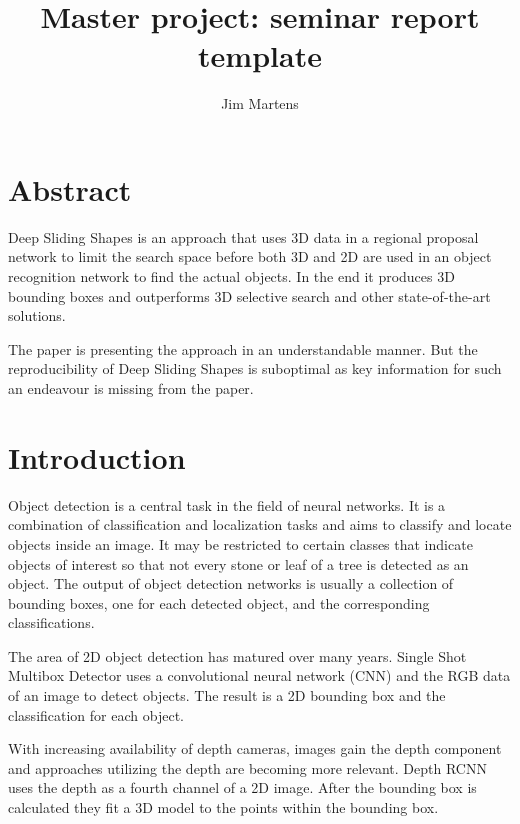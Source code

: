 \documentclass[12pt]{scrartcl}
\begin{document}
\title{Master project: seminar report template}
\author{Jim Martens}

\maketitle
\section*{Abstract}

Deep Sliding Shapes is an approach that uses 3D data in a regional proposal
network to limit the search space before both 3D and 2D are used in an object
recognition network to find the actual objects. In the end it produces 3D
bounding boxes and outperforms 3D selective search and other state-of-the-art
solutions.

The paper is presenting the approach in an understandable manner. But the
reproducibility of Deep Sliding Shapes is suboptimal as key information for
such an endeavour is missing from the paper.


\setcounter{tocdepth}{2} 					%
\tableofcontents
{}
\clearpage

\section{Introduction}

Object detection is a central task in the field of neural networks. It is a
combination of classification and localization tasks and aims to classify
and locate objects inside an image. It may be restricted to certain classes
that indicate objects of interest so that not every stone or leaf of a tree
is detected as an object. The output of object detection networks is usually
a collection of bounding boxes, one for each detected object, and the corresponding
classifications.

The area of 2D object detection has matured over many years. Single Shot Multibox
Detector\cite{Liu2016} uses a convolutional neural network (CNN) and the RGB
data of an image to detect objects. The result is a 2D bounding box and the
classification for each object.

With increasing availability of depth cameras, images gain the depth component
and approaches utilizing the depth are becoming more relevant. Depth RCNN\cite{Gupta2015}
uses the depth as a fourth channel of a 2D image. After the bounding box
is calculated they fit a 3D model to the points within the bounding box.
\end{document}
